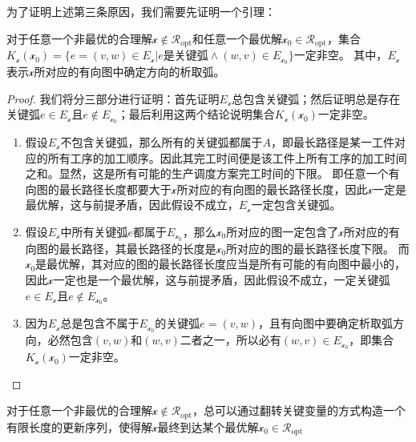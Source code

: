 为了证明上述第三条原因，我们需要先证明一个引理：
\begin{lemma} \label{lemma:set_K_not_empty}
    对于任意一个非最优的合理解$\mathcal{x}\notin \mathscr{R}_\text{opt}$和任意一个最优解$\mathcal{x}_{0} \in \mathscr{R}_\text{opt}$，集合$K_{\mathcal{x}}(\mathcal{x}_0)=\{e=(v,w)\in E_{\mathcal{x}}|e \text{是关键弧}\wedge (w,v)\in E_{\mathcal{x}_0}\}$一定非空。
    其中，$E_{\mathcal{x}}$表示$\mathcal{x}$所对应的有向图中确定方向的析取弧。
\end{lemma}

\begin{proof}
    我们将分三部分进行证明：首先证明$E_{\mathcal{x}}$总包含关键弧；然后证明总是存在关键弧$e \in E_{\mathcal{x}}$且$e \notin E_{\mathcal{x}_0}$；最后利用这两个结论说明集合$K_{\mathcal{x}}(\mathcal{x}_0)$一定非空。
    \begin{enumerate}
        \item 假设$E_{\mathcal{x}}$不包含关键弧，那么所有的关键弧都属于$A$，即最长路径是某一工件对应的所有工序的加工顺序。因此其完工时间便是该工件上所有工序的加工时间之和。显然，这是所有可能的生产调度方案完工时间的下限。
        即任意一个有向图的最长路径长度都要大于$\mathcal{x}$所对应的有向图的最长路径长度，因此$\mathcal{x}$一定是最优解，这与前提矛盾，因此假设不成立，$E_{\mathcal{x}}$一定包含关键弧。
        \item 假设$E_{\mathcal{x}}$中所有关键弧$e$都属于$E_{\mathcal{x}_0}$，那么$\mathcal{x}_0$所对应的图一定包含了$\mathcal{x}$所对应的有向图的最长路径，其最长路径的长度是$\mathcal{x}_0$所对应的图的最长路径长度下限。
        而$\mathcal{x}_0$是最优解，其对应的图的最长路径长度应当是所有可能的有向图中最小的，因此$\mathcal{x}$一定也是一个最优解，这与前提矛盾，因此假设不成立，一定关键弧$e \in E_{\mathcal{x}}$且$e \notin E_{\mathcal{x}_0}$。
        \item 因为$E_{\mathcal{x}}$总是包含不属于$E_{\mathcal{x}_0}$的关键弧$e=(v,w)$，且有向图中要确定析取弧方向，必然包含$(v,w)\text{和}(w,v)$二者之一，所以必有$(w,v) \in E_{\mathcal{x}_0}$，即集合$K_{\mathcal{x}}(\mathcal{x}_0)$一定非空。
    \end{enumerate}
\end{proof}

\begin{theorem} \label{theorem:update_convergence}
    对于任意一个非最优的合理解$\mathcal{x} \notin \mathscr{R}_\text{opt}$，总可以通过翻转关键变量的方式构造一个有限长度的更新序列，使得解$\mathcal{x}$最终到达某个最优解$\mathcal{x}_{0} \in \mathscr{R}_\text{opt}$
\end{theorem}

